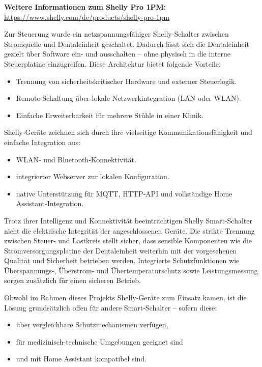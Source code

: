 \noindent\textbf{Weitere Informationen zum Shelly Pro 1PM:} \href{https://www.shelly.com/de/products/shelly-pro-1pm}{https://www.shelly.com/de/products/shelly-pro-1pm}


Zur Steuerung wurde ein netzspannungsfähiger Shelly-Schalter zwischen Stromquelle und Dentaleinheit geschaltet. Dadurch lässt sich die Dentaleinheit gezielt über Software ein- und ausschalten – ohne physisch in die interne Steuerplatine einzugreifen. Diese Architektur bietet folgende Vorteile:
\begin{itemize}
  \item Trennung von sicherheitskritischer Hardware und externer Steuerlogik.\\
  \item Remote-Schaltung über lokale Netzwerkintegration (LAN oder WLAN).\\
  \item Einfache Erweiterbarkeit für mehrere Stühle in einer Klinik.
\end{itemize}

Shelly-Geräte zeichnen sich durch ihre vielseitige Kommunikationsfähigkeit und einfache Integration aus:
\begin{itemize}
  \item WLAN- und Bluetooth-Konnektivität.\\
  \item integrierter Webserver zur lokalen Konfiguration.\\
  \item native Unterstützung für MQTT, HTTP-API und vollständige Home Assistant-Integration.
\end{itemize}

Trotz ihrer Intelligenz und Konnektivität beeinträchtigen Shelly Smart-Schalter nicht die elektrische Integrität der angeschlossenen Geräte. Die strikte Trennung zwischen Steuer- und Lastkreis stellt sicher, dass sensible Komponenten wie die Stromversorgungsplatine der Dentaleinheit weiterhin mit der vorgesehenen Qualität und Sicherheit betrieben werden. Integrierte Schutzfunktionen wie Überspannungs-, Überstrom- und Übertemperaturschutz sowie Leistungsmessung sorgen zusätzlich für einen sicheren Betrieb.

Obwohl im Rahmen dieses Projekts Shelly-Geräte zum Einsatz kamen, ist die Lösung grundsätzlich offen für andere Smart-Schalter – sofern diese:
\begin{itemize}
  \item über vergleichbare Schutzmechanismen verfügen,\\
  \item für medizinisch-technische Umgebungen geeignet sind\\
  \item und mit Home Assistant kompatibel sind.
\end{itemize}

